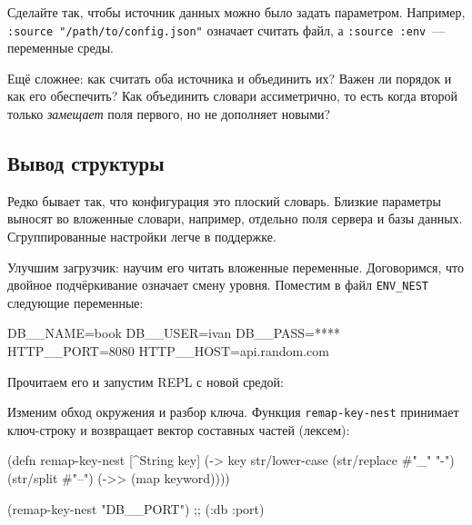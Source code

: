 Сделайте так, чтобы источник данных можно было задать параметром. Например,
\verb|:source "/path/to/config.json"| означает считать файл, а
\verb|:source :env|~--- переменные среды.


Ещё сложнее: как считать оба источника и объединить их? Важен ли порядок и
как его обеспечить? Как объединить словари ассиметрично, то есть когда второй
только \emph{замещает} поля первого, но не дополняет новыми?

\subsection{Вывод структуры}


Редко бывает так, что конфигурация это плоский словарь. Близкие параметры
выносят во вложенные словари, например, отдельно поля сервера и базы
данных. Сгруппированные настройки легче в поддержке.

Улучшим загрузчик: научим его читать вложенные переменные. Договоримся, что
двойное подчёркивание означает смену уровня. Поместим в файл \verb|ENV_NEST|
следующие переменные:

\begin{english}
  \begin{bash}
DB__NAME=book
DB__USER=ivan
DB__PASS=****
HTTP__PORT=8080
HTTP__HOST=api.random.com
  \end{bash}
\end{english}


\noindent
Прочитаем его и запустим REPL с новой средой:

\begin{english}
\end{english}

Изменим обход окружения и разбор ключа. Функция \verb|remap-key-nest|
принимает ключ-строку и возвращает вектор составных частей (лексем):

\begin{english}
  \begin{clojure}
(defn remap-key-nest
  [^String key]
  (-> key
      str/lower-case
      (str/replace #"_" "-")
      (str/split #"--")
      (->> (map keyword))))

(remap-key-nest "DB__PORT")
;; (:db :port)
  \end{clojure}
\end{english}

